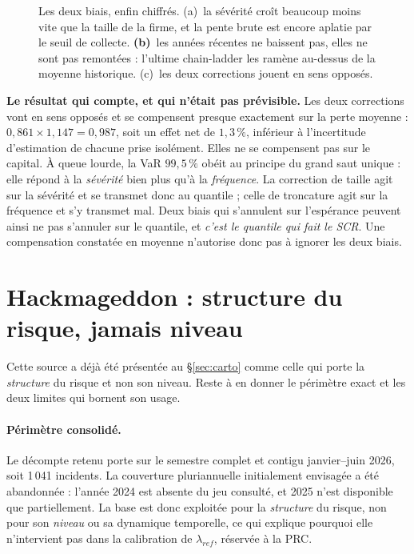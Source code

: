 \begin{figure}[htbp]\centering
{}
\caption{Les deux biais, enfin chiffrés. (a)~la sévérité croît beaucoup moins vite
que la taille de la firme, et la pente brute est encore aplatie par le seuil de collecte.
\textbf{(b)}~les années récentes ne baissent pas, elles ne sont pas remontées : l'ultime
chain-ladder les ramène au-dessus de la moyenne historique. (c)~les deux corrections
jouent en sens opposés.}
\label{fig:biais}
\end{figure}

\begin{cle}
\textbf{Le résultat qui compte, et qui n'était pas prévisible.} Les deux corrections vont en
sens opposés et se compensent presque exactement sur la perte moyenne :
$0{,}861\times1{,}147=0{,}987$, soit un effet net de $1{,}3\,\%$, inférieur à l'incertitude
d'estimation de chacune prise isolément. Elles ne se compensent pas sur le capital.
À queue lourde, la VaR $99{,}5\,\%$ obéit au principe du grand saut unique : elle répond à la
\emph{sévérité} bien plus qu'à la \emph{fréquence}. La correction de taille agit sur la
sévérité et se transmet donc au quantile ; celle de troncature agit sur la fréquence et s'y
transmet mal. Deux biais qui s'annulent sur l'espérance peuvent ainsi ne pas s'annuler sur le
quantile, et \emph{c'est le quantile qui fait le SCR}. Une compensation constatée en moyenne
n'autorise donc pas à ignorer les deux biais.
\end{cle}



\section{Hackmageddon : structure du risque, jamais niveau}

Cette source a déjà été présentée au \S\ref{sec:carto} comme celle qui porte la
\emph{structure} du risque et non son niveau. Reste à en donner le périmètre exact et les
deux limites qui bornent son usage.

\paragraph{Périmètre consolidé.} Le décompte retenu porte sur le semestre complet et contigu
janvier--juin 2026, soit 1\,041 incidents. La couverture pluriannuelle initialement
envisagée a été abandonnée : l'année 2024 est absente du jeu consulté, et 2025 n'est
disponible que partiellement. La base est donc exploitée pour la \emph{structure} du risque,
non pour son \emph{niveau} ou sa dynamique temporelle, ce qui explique pourquoi elle
n'intervient pas dans la calibration de $\lambda_{ref}$, réservée à la PRC.

